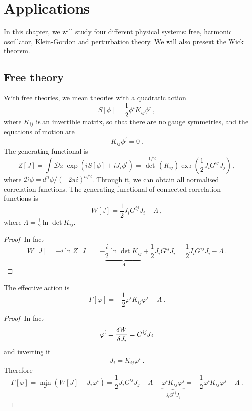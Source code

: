 \chapter{Applications}

    In this chapter, we will study four different physical systems: free, harmonic oscillator, Klein-Gordon and perturbation theory. We will also present the Wick theorem.

\section{Free theory}   

    With free theories, we mean theories with a quadratic action 
    \begin{equation*}
        S[\phi] = \frac{1}{2} \phi^i K_{ij} \phi^j ~,
    \end{equation*}
    where $K_{ij}$ is an invertible matrix, so that there are no gauge symmetries, and the equations of motion are 
    \begin{equation*}
        K_{ij} \phi^j = 0 ~.
    \end{equation*}
    The generating functional is 
    \begin{equation*}
        Z[J] = \int \mathcal D x ~ \exp(i S[\phi] + i J_i \phi^i) = {\det}^{-1/2} (K_{ij}) \exp(\frac{1}{2} J_i G^{ij} J_j) ~,
    \end{equation*}
    where $\mathcal D \phi = d^n \phi /(- 2 \pi i)^{n/2}$. Through it, we can obtain all normalised correlation functions. 
    The generating functional of connected correlation functions is 
    \begin{equation*}
        W[J] = \frac{1}{2} J_i G^{ij} J_i - \Lambda ~,
    \end{equation*} 
    where $\Lambda = \frac{i}{2} \ln \det K_{ij}$.
    \begin{proof}
        In fact 
        \begin{equation*}
            W[J] = - i \ln Z[J] = - \underbrace{\frac{i}{2} \ln \det K_{ij}}_\Lambda + \frac{1}{2}  J_i G^{ij} J_i = \frac{1}{2} J_i G^{ij} J_i - \Lambda  ~.
        \end{equation*}
    \end{proof}
    The effective action is 
    \begin{equation*}
        \Gamma[\varphi] = - \frac{1}{2} \varphi^i K_{ij} \varphi^j - \Lambda ~.
    \end{equation*}
    \begin{proof}
        In fact 
        \begin{equation*}
            \varphi^i = \frac{\delta W}{\delta J_i} = G^{ij} J_j
        \end{equation*}
        and inverting it 
        \begin{equation*}
            J_i = K_{ij} \varphi^i ~.
        \end{equation*}
        Therefore
        \begin{equation*}
            \Gamma[\varphi] = \min_J (W[J] - J_i \varphi^i) = \frac{1}{2} J_i G^{ij} J_j - \Lambda - \underbrace{\varphi^i K_{ij} \varphi^j}_{J_i G^{ij} J_j} = - \frac{1}{2} \varphi^i K_{ij} \varphi^j - \Lambda ~.
        \end{equation*}
    \end{proof}
